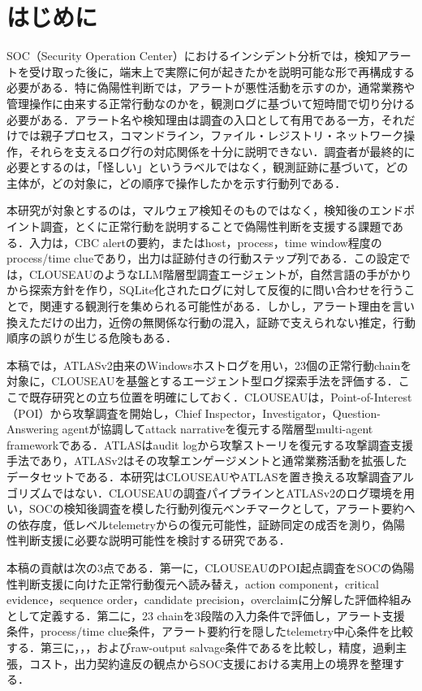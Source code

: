 ﻿

\section{はじめに}

SOC（Security Operation Center）におけるインシデント分析では，検知アラートを受け取った後に，端末上で実際に何が起きたかを説明可能な形で再構成する必要がある．特に偽陽性判断では，アラートが悪性活動を示すのか，通常業務や管理操作に由来する正常行動なのかを，観測ログに基づいて短時間で切り分ける必要がある．アラート名や検知理由は調査の入口として有用である一方，それだけでは親子プロセス，コマンドライン，ファイル・レジストリ・ネットワーク操作，それらを支えるログ行の対応関係を十分に説明できない．調査者が最終的に必要とするのは，「怪しい」というラベルではなく，観測証跡に基づいて，どの主体が，どの対象に，どの順序で操作したかを示す行動列である．

本研究が対象とするのは，マルウェア検知そのものではなく，検知後のエンドポイント調査，とくに正常行動を説明することで偽陽性判断を支援する課題である．入力は，CBC alertの要約，またはhost，process，time window程度のprocess/time clueであり，出力は証跡付きの行動ステップ列である．この設定では，CLOUSEAUのようなLLM階層型調査エージェント\cite{clouseau}が，自然言語の手がかりから探索方針を作り，SQLite化されたログに対して反復的に問い合わせを行うことで，関連する観測行を集められる可能性がある．しかし，アラート理由を言い換えただけの出力，近傍の無関係な行動の混入，証跡で支えられない推定，行動順序の誤りが生じる危険もある．

本稿では，ATLASv2由来のWindowsホストログを用い，23個の正常行動chainを対象に，CLOUSEAUを基盤とするエージェント型ログ探索手法を評価する．ここで既存研究との立ち位置を明確にしておく．CLOUSEAUは，Point-of-Interest（POI）から攻撃調査を開始し，Chief Inspector，Investigator，Question-Answering agentが協調してattack narrativeを復元する階層型multi-agent frameworkである\cite{clouseau}．ATLASはaudit logから攻撃ストーリを復元する攻撃調査支援手法であり\cite{atlas}，ATLASv2はその攻撃エンゲージメントと通常業務活動を拡張したデータセットである\cite{atlasv2}．本研究はCLOUSEAUやATLASを置き換える攻撃調査アルゴリズムではない．CLOUSEAUの調査パイプラインとATLASv2のログ環境を用い，SOCの検知後調査を模した行動列復元ベンチマークとして，アラート要約への依存度，低レベルtelemetryからの復元可能性，証跡同定の成否を測り，偽陽性判断支援に必要な説明可能性を検討する研究である．

本稿の貢献は次の3点である．第一に，CLOUSEAUのPOI起点調査をSOCの偽陽性判断支援に向けた正常行動復元へ読み替え，action component，critical evidence，sequence order，candidate precision，overclaimに分解した評価枠組みとして定義する．第二に，23 chainを3段階の入力条件で評価し，アラート支援条件，process/time clue条件，アラート要約行を隠したtelemetry中心条件を比較する．第三に，，，およびraw-output salvage条件であるを比較し，精度，過剰主張，コスト，出力契約違反の観点からSOC支援における実用上の境界を整理する．


